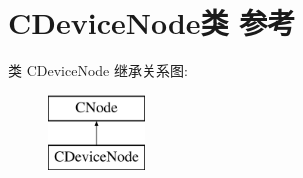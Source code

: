 \hypertarget{class_c_device_node}{}\section{C\+Device\+Node类 参考}
\label{class_c_device_node}
类 C\+Device\+Node 继承关系图\+:\begin{figure}[H]
\begin{center}
\leavevmode
\includegraphics[height=2.000000cm]{class_c_device_node}
\end{center}
\end{figure}
